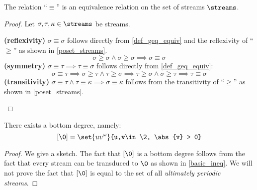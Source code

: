 \begin{proposition}\label{equivalence_relation}
	The relation ``$\equiv$'' is an equivalence relation on the set of streams $\streams$.
	\begin{proof}
		Let $\sigma,\tau,\kappa\in\streams$ be streams.
		\begin{sindent}
			\textbf{(reflexivity)} $\sigma \equiv \sigma$ follows directly from \cref{def_geq_equiv} and the reflexivity of ``$\geq$'' as shown in \cref{poset_streams}.
			$$\sigma \geq \sigma \land \sigma \geq \sigma \implies \sigma \equiv \sigma$$
			\textbf{(symmetry)} $\sigma \equiv \tau \implies \tau \equiv \sigma$ follows directly from \cref{def_geq_equiv}: 
			$$\sigma \equiv \tau \implies \sigma \geq \tau \land \tau \geq \sigma \implies  \tau \geq \sigma \land \sigma \geq \tau \implies \tau \equiv \sigma$$
			\textbf{(transitivity)} $\sigma \equiv \tau \land \tau \equiv \kappa \implies \sigma \equiv \kappa$ follows from the transitivity of ``$\geq$'' as shown in \cref{poset_streams}.
		\end{sindent}
	\end{proof}
\end{proposition}

\begin{theorem}
	There exists a bottom degree, namely:
	$$[\0] = \set{uv^{\omega}}{u,v\in\2, \abs{v} > 0}$$
	\begin{proof} We give a sketch.
		The fact that $[\0]$ is a bottom degree follows from the fact that every stream can be transduced to $\0$ as shown in \cref{basic_ineq}. We will not prove the fact that $[\0]$ is equal to the set of all \textit{ultimately periodic streams}.
	\end{proof}
\end{theorem}